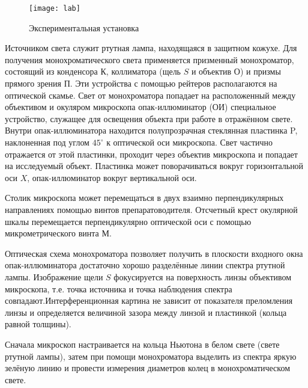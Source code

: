 \documentclass[12pt]{kiarticle} %
\begin{document}
	\begin{wrapfigure}{r}{0.5\linewidth} 
	\texttt{[image: lab]}
	\caption{Экспериментальная установка}
	\label{lab}
\end{wrapfigure}

	Источником света служит ртутная лампа, находящаяся в защитном кожухе. Для получения монохроматического света применяется призменный монохроматор, состоящий из конденсора $ К $, коллиматора (щель $ S $ и объектив $ О $) и призмы прямого зрения $ П $. Эти устройства с помощью рейтеров располагаются на оптической скамье. Свет от монохроматора попадает на расположенный между объективом и окуляром микроскопа опак-иллюминатор (ОИ)  специальное устройство, служащее для освещения объекта при работе в отражённом свете. Внутри опак-иллюминатора находится полупрозрачная стеклянная пластинка P, наклоненная под углом $ 45^\circ $ к оптической оси микроскопа. Свет частично отражается от этой пластинки, проходит через объектив микроскопа и попадает на исследуемый объект. Пластинка может поворачиваться вокруг горизонтальной оси $ X $, опак-иллюминатор вокруг вертикальной оси.

	Столик микроскопа может перемещаться в двух взаимно перпендикулярных направлениях помощью винтов препаратоводителя. Отсчетный крест окулярной шкалы перемещается перпендикулярно оптической оси с помощью микрометрического винта $ М $.
	
	Оптическая схема монохроматора позволяет получить в плоскости входного окна опак-иллюминатора достаточно хорошо разделённые линии спектра ртутной лампы. Изображение щели $ S $ фокусируется на поверхность линзы объективом микроскопа, т.е. точка источника и точка наблюдения спектра совпадают.Интерференционная картина не зависит от показателя преломления линзы и определяется величиной зазора между линзой и пластинкой (кольца равной толщины).

	Сначала микроскоп настраивается на кольца Ньютона в белом свете (свете ртутной лампы), затем при помощи монохроматора выделить из спектра яркую зелёную линию и провести измерения диаметров колец в монохроматическом свете. 
	
\end{document}
